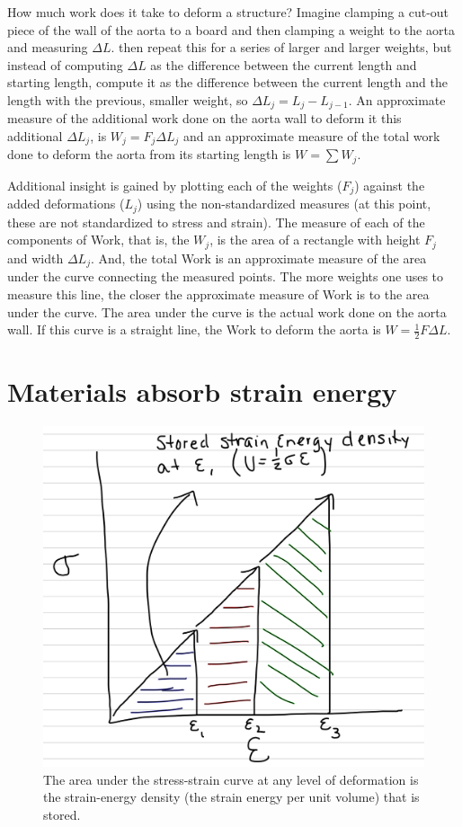 \documentclass[]{book}
\begin{document}
How much work does it take to deform a structure? Imagine clamping a
cut-out piece of the wall of the aorta to a board and then clamping a
weight to the aorta and measuring \(\Delta L\). then repeat this for a
series of larger and larger weights, but instead of computing
\(\Delta L\) as the difference between the current length and starting
length, compute it as the difference between the current length and the
length with the previous, smaller weight, so
\(\Delta L_j = L_j - L_{j-1}\). An approximate measure of the additional
work done on the aorta wall to deform it this additional \(\Delta L_j\),
is \(W_j=F_j\Delta L_j\) and an approximate measure of the total work
done to deform the aorta from its starting length is \(W=\sum{W_j}\).

Additional insight is gained by plotting each of the weights (\(F_j\))
against the added deformations (\(L_j\)) using the non-standardized
measures (at this point, these are not standardized to stress and
strain). The measure of each of the components of Work, that is, the
\(W_j\), is the area of a rectangle with height \(F_j\) and width
\(\Delta L_j\). And, the total Work is an approximate measure of the
area under the curve connecting the measured points. The more weights
one uses to measure this line, the closer the approximate measure of
Work is to the area under the curve. The area under the curve is the
actual work done on the aorta wall. If this curve is a straight line,
the Work to deform the aorta is \(W=\frac{1}{2}F \Delta L\).

\section{Materials absorb strain
energy}\label{materials-absorb-strain-energy}

\begin{figure}
\centering
\includegraphics{images/materials_chapter/strain_energy_density.png}
\caption{\label{fig:unnamed-chunk-10}The area under the stress-strain curve
at any level of deformation is the strain-energy density (the strain
energy per unit volume) that is stored.}
\end{figure}
\end{document}
